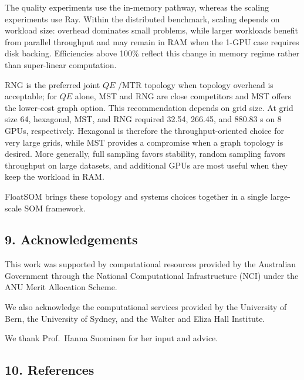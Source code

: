 \documentclass[
]{article}
\providecommand{\DIFadd}[1]{{\protect\color{blue} #1}} %
\providecommand{\DIFaddbegin}{} %
\providecommand{\DIFaddend}{} %
\begin{document}
 \DIFaddbegin \DIFadd{The quality experiments use the in-memory pathway, whereas the scaling
experiments use Ray. Within the distributed benchmark, scaling depends
on workload size: overhead dominates small problems, while larger
workloads benefit from }\DIFaddend parallel throughput and  \DIFaddbegin \DIFadd{may }\DIFaddend remain in RAM  \DIFaddbegin \DIFadd{when
}\DIFaddend the 1-GPU  \DIFaddbegin \DIFadd{case requires disk backing. Efficiencies }\DIFaddend above 100\%  \DIFaddbegin \DIFadd{reflect
this change in memory regime rather than }\DIFaddend super-linear  \DIFaddbegin \DIFadd{computation}\DIFaddend .

 \DIFaddbegin \DIFadd{RNG is the preferred joint }\DIFaddend \(QE\) \DIFaddbegin \DIFadd{/MTR topology when topology overhead is
acceptable; for \(QE\) alone, MST and RNG are close competitors and MST
offers the lower-cost graph option. This recommendation depends on grid
size. At grid size 64, hexagonal, MST, and RNG required 32.54, 266.45,
and 880.83 s on 8 GPUs, respectively. Hexagonal is therefore the
throughput-oriented choice for very large grids, while MST provides a
compromise when a graph topology is desired. More generally, full
sampling favors stability, random sampling favors throughput on large
datasets, and additional GPUs are most useful when they keep the
workload in RAM.
}\DIFaddend

 \DIFaddbegin \DIFadd{FloatSOM brings these topology and systems choices together in a single
}\DIFaddend large-scale  \DIFaddbegin \DIFadd{SOM framework}\DIFaddend .

\subsection{9. Acknowledgements}\label{acknowledgements}

This work was supported by computational resources provided by the
Australian Government through the National Computational Infrastructure
(NCI) under the ANU Merit Allocation Scheme.

We also acknowledge the computational services provided by the
University of Bern, the University of Sydney, and the Walter and Eliza
Hall Institute.

We thank Prof.~Hanna Suominen for her input and advice.

\subsection{10. References}\label{references}
\end{document}
